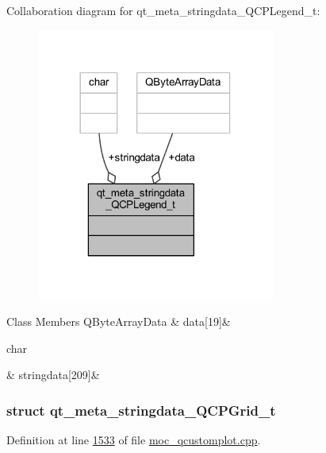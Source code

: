Collaboration diagram for qt\+\_\+meta\+\_\+stringdata\+\_\+\+Q\+C\+P\+Legend\+\_\+t\+:
\nopagebreak
\begin{figure}[H]
\begin{center}
\leavevmode
\includegraphics[width=222pt]{d2/d94/a00184}
\end{center}
\end{figure}
\begin{DoxyFields}{Class Members}
\hypertarget{a00016_abb2a7af4ffa957bddb891b5663c0aa55}{Q\+Byte\+Array\+Data}\label{a00016_abb2a7af4ffa957bddb891b5663c0aa55}
&
data\mbox{[}19\mbox{]}&
\\
\hline

\hypertarget{a00016_a26b79395b8d9f94641f81b197841ede1}{char}\label{a00016_a26b79395b8d9f94641f81b197841ede1}
&
stringdata\mbox{[}209\mbox{]}&
\\
\hline

\end{DoxyFields}
\label{d0/dc2/a00104}
\hypertarget{a00016_d0/dc2/a00104}{}
\subsubsection{struct qt\+\_\+meta\+\_\+stringdata\+\_\+\+Q\+C\+P\+Grid\+\_\+t}


Definition at line \hyperlink{a00016_source_l01533}{1533} of file \hyperlink{a00016_source}{moc\+\_\+qcustomplot.\+cpp}.



